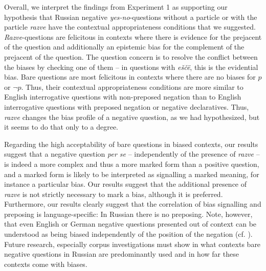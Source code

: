 \documentclass[output=paper,colorlinks,citecolor=brown]{langscibook}
\begin{document}
Overall, we interpret the findings from Experiment 1 as supporting our hypothesis that Russian negative \textit{yes-no}-questions without a particle or with the particle \textit{razve} have the contextual appropriateness conditions that we suggested. \textit{Razve}-questions are felicitous in contexts where there is evidence for the prejacent of the question and additionally an epistemic bias for the complement of the prejacent of the question. The question concern is to resolve the conflict between the biases by checking one of them – in questions with \textit{eščë}, this is the evidential bias. Bare questions are most felicitous in contexts where there are no biases for $p$ or $\neg p$. Thus, their contextual appropriateness conditions are more similar to English interrogative questions with non-preposed negation than to English interrogative questions with preposed negation or negative declaratives. Thus, \textit{razve} changes the bias profile of a negative question, as we had hypothesized, but it seems to do that only to a degree. 

Regarding the high acceptability of bare questions in biased contexts, our results suggest that a negative question \textit{per se} – independently of the presence of \textit{razve} – is indeed a more complex and thus a more marked form than a positive question, and a marked form is likely to be interpreted as signalling a marked meaning, for instance a particular bias. Our results suggest that the additional presence of \textit{razve} is not strictly necessary to mark a bias, although it is preferred. Furthermore, our results clearly suggest that the correlation of bias signalling and preposing is language-specific: In Russian there is no preposing. Note, however, that even English or German negative questions presented out of context can be understood as being biased independently of the position of the negation (cf. \citealt{romerohan2004negative}). Future research, especially corpus investigations must show in what contexts bare negative questions in Russian are predominantly used and in how far these contexts come with biases.
\end{document}
